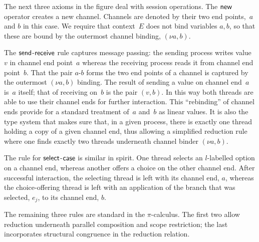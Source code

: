 The next three axioms in the figure deal with session operations. The
$\mathsf{new}$ operator creates a new channel. Channels are denoted by their
two end points,~$a$ and $b$ in this case. We require that context~$E$
does not bind variables $a,b$, so that these are bound by the
outermost channel binding, $(\nu a,b)$.

The $\mathsf{send}$-$\mathsf{receive}$ rule captures message passing: the sending
process writes value~$v$ in channel end point~$a$ whereas the
receiving process reads it from channel end point~$b$. That the pair
$a$-$b$ forms the two end points of a channel is captured by the
outermost $(\nu a,b)$ binding. The result of sending a value on channel
end~$a$ is~$a$ itself; that of receiving on~$b$ is the pair
$(v,b)$. In this way both threads are able to use their channel ends
for further interaction. This ``rebinding'' of channel ends provide
for a standard treatment of~$a$ and~$b$ as linear values. It is also
the type system that makes sure that, in a given process, there is
exactly one thread holding a copy of a given channel end, thus
allowing a simplified reduction rule where one finds exactly two
threads underneath channel binder $(\nu a,b)$.

The rule for $\mathsf{select}$-$\mathsf{case}$ is similar in spirit. One thread
selects an $l$-labelled option on a channel end, whereas another offers
a choice on the other channel end. After successful interaction, the
selecting thread is left with its channel end, $a$, whereas the
choice-offering thread is left with an application of the
branch that was selected, $e_j$, to its channel end, $b$.

The remaining three rules are standard in the $\pi$-calculus. The
first two allow reduction underneath parallel composition and scope
restriction; the last incorporates structural congruence in the
reduction relation.


